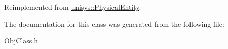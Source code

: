 Reimplemented from \hyperlink{classunisys_1_1PhysicalEntity_ad445727cb6b1c12e954819d8207104e8}{unisys\-::\-Physical\-Entity}.



The documentation for this class was generated from the following file\-:\begin{DoxyCompactItemize}
\item 
\hyperlink{ObjClass_8h}{Obj\-Class.\-h}\end{DoxyCompactItemize}
